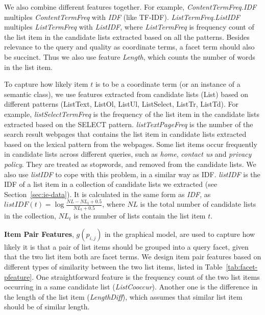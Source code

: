 We also combine different  features together. For example, \textit{ContentTermFreq.IDF} multiples \textit{ContentTermFreq} with \textit{IDF} (like TF-IDF). \textit{ListTermFreq.ListIDF} multiples \textit{ListTermFreq} with \textit{ListIDF}, where \textit{ListTermFreq} is frequency count of the list item in the candidate lists extracted based on all the patterns. Besides relevance to the 
query and quality as coordinate terms, a facet term should also be succinct. Thus we also use feature \textit{Length}, which counts the number of words in the list item.





To capture how likely item $t$ is to be a coordinate term (or an instance of a semantic class), we use features extracted from candidate lists (List) based on different patterns (ListText, ListOl, ListUl, ListSelect, ListTr, ListTd). For example, \textit{listSelectTermFreq} is the frequency of the list item in the candidate lists extracted based on the SELECT pattern. \textit{listTextPageFreq} is the number of the search result webpages that contains the list item in candidate lists extracted based on the lexical pattern from the webpages. Some list items occur frequently in candidate lists across different queries, such as \textit{home}, \textit{contact us} and \textit{privacy policy}. They are treated as stopwords, and removed from the candidate lists. We also use \textit{listIDF} to cope with this problem, in a similar way as IDF.  \textit{listIDF} is the IDF of a list item in a collection of candidate lists we extracted (see Section~\ref{sec:ie-data}). It is calculated in the same form as \textit{IDF}, 
as $listIDF(t)=\log{\frac{NL-NL_{t}+0.5}{NL_t+0.5}}$, where $NL$ is the total number of candidate lists in the collection,  $NL_t$ is the number of lists contain the list item $t$.


\textbf{Item Pair Features}, $g(p_{i,j})$ in the graphical model, are used to capture how likely it is that a pair of list items should be grouped into a query facet, given that the two list item both are facet terms. We design item pair features based on different types of similarity between the two list items,  listed in Table~\ref{tab:facet-pfeature}. One straightforward feature is the frequency count of the two list items occurring in a same candidate list (\textit{ListCooccur}). Another one is the difference in the length of the list item (\textit{LengthDiff}), which assumes that similar list item should be of similar length. 

